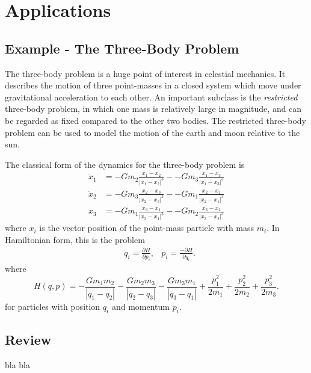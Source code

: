 \section{Applications}

\subsection{Example - The Three-Body Problem}

The three-body problem \cite{musielak2014three} is a huge point of interest in celestial mechanics.
It describes the motion of three point-masses in a closed system which move under gravitational acceleration to each other.
An important subclass is the \textit{restricted} three-body problem, in which one mass is relatively large in magnitude, and can be regarded as fixed compared to the other two bodies.
The restricted three-body problem can be used to model the motion of the earth and moon relative to the sun.

The classical form of the dynamics for the three-body problem is
\begin{equation*}
	\begin{aligned}
		\ddot{x}_1 &= -G m_2 \frac{x_1 - x_2}{|x_1 - x_2|^3} - -G m_3 \frac{x_1 - x_3}{|x_1 - x_3|^3} \\
		\ddot{x}_2 &= -G m_3 \frac{x_2 - x_3}{|x_2 - x_3|^3} - -G m_1 \frac{x_2 - x_1}{|x_2 - x_1|^3} \\
		\ddot{x}_3 &= -G m_1 \frac{x_3 - x_1}{|x_3 - x_1|^3} - -G m_2 \frac{x_3 - x_2}{|x_3 - x_2|^3}
	\end{aligned}
\end{equation*} 
where $x_i$ is the vector position of the point-mass particle with mass $m_i$.
In Hamiltonian form, this is the problem
\begin{align*}
	&\dot{q}_i = \frac{\partial H}{\partial p_i}, &\dot{p}_i = \frac{- \partial H}{\partial q_i}.
\end{align*}
where
\begin{equation*}
	H(q,p) = - \frac{G m_1 m_2}{|q_1 - q_2|} - \frac{G m_2 m_3}{|q_2 - q_3|} - \frac{G m_3 m_1}{|q_3 - q_1|} + \frac{p_1^2}{2m_1} + \frac{p_2^2}{2m_2} + \frac{p_3^2}{2m_3}.
\end{equation*}
for particles with position $q_i$ and momentum $p_i$.


\subsection{Review}

bla bla


